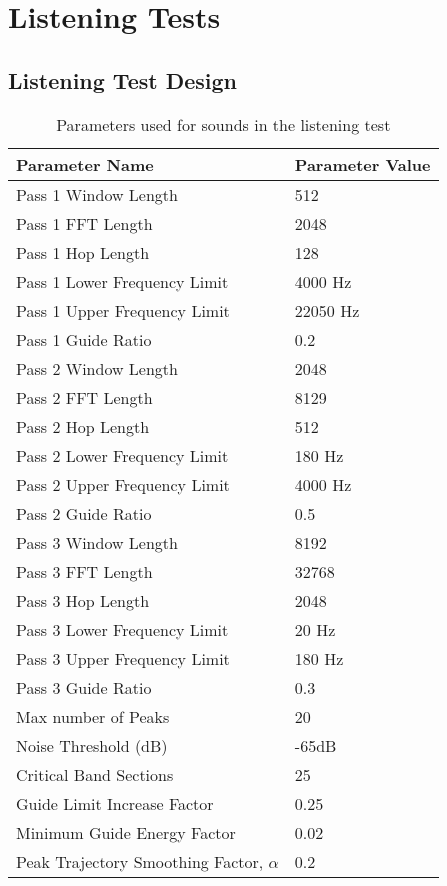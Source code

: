 \appendix

\chapter{Listening Tests}

\label{apd:ltest_data}
\section{Listening Test Design}

\begin{table}[h]
\begin{center}
\begin{tabular}{| l | l |}
\hline
Parameter Name & Parameter Value\\
\hline
Pass 1 Window Length & 512 \\
Pass 1 FFT Length & 2048\\
Pass 1 Hop Length & 128\\
Pass 1 Lower Frequency Limit & 4000 Hz\\
Pass 1 Upper Frequency Limit & 22050 Hz\\
Pass 1 Guide Ratio & 0.2\\
\hline
Pass 2 Window Length & 2048\\
Pass 2 FFT Length & 8129\\
Pass 2 Hop Length & 512\\
Pass 2 Lower Frequency Limit & 180 Hz\\
Pass 2 Upper Frequency Limit & 4000 Hz\\
Pass 2 Guide Ratio & 0.5\\
\hline
Pass 3 Window Length & 8192\\
Pass 3 FFT Length & 32768\\
Pass 3 Hop Length & 2048\\
Pass 3 Lower Frequency Limit & 20 Hz\\
Pass 3 Upper Frequency Limit & 180 Hz\\
Pass 3 Guide Ratio  & 0.3\\
\hline
Max number of Peaks & 20\\
Noise Threshold (dB) & -65dB\\
Critical Band Sections & 25\\
Guide Limit Increase Factor & 0.25\\
Minimum Guide Energy Factor & 0.02\\
Peak Trajectory Smoothing Factor, $\alpha$ & 0.2\\
\hline
\end{tabular}
\caption{Parameters used for sounds in the listening test}
\label{tab:sms_listening_test_params}
\end{center}
\end{table}

